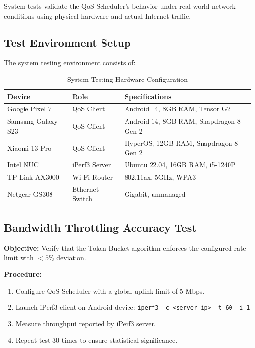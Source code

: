 System tests validate the QoS Scheduler's behavior under real-world network conditions using physical hardware and actual Internet traffic.

\subsection{Test Environment Setup}

The system testing environment consists of:

\begin{table}[H]
\centering
\caption{System Testing Hardware Configuration}
\label{tab:system_test_hardware}
\begin{tabular}{@{}lll@{}}
\toprule
\textbf{Device} & \textbf{Role} & \textbf{Specifications} \\
\midrule
Google Pixel 7 & QoS Client & Android 14, 8GB RAM, Tensor G2 \\
Samsung Galaxy S23 & QoS Client & Android 14, 8GB RAM, Snapdragon 8 Gen 2 \\
Xiaomi 13 Pro & QoS Client & HyperOS, 12GB RAM, Snapdragon 8 Gen 2 \\
Intel NUC & iPerf3 Server & Ubuntu 22.04, 16GB RAM, i5-1240P \\
TP-Link AX3000 & Wi-Fi Router & 802.11ax, 5GHz, WPA3 \\
Netgear GS308 & Ethernet Switch & Gigabit, unmanaged \\
\bottomrule
\end{tabular}
\end{table}

\subsection{Bandwidth Throttling Accuracy Test}

\textbf{Objective:} Verify that the Token Bucket algorithm enforces the configured rate limit with $<5\%$ deviation.

\textbf{Procedure:}
\begin{enumerate}
    \item Configure QoS Scheduler with a global uplink limit of 5 Mbps.
    \item Launch iPerf3 client on Android device: \texttt{iperf3 -c <server\_ip> -t 60 -i 1}
    \item Measure throughput reported by iPerf3 server.
    \item Repeat test 30 times to ensure statistical significance.
\end{enumerate}

